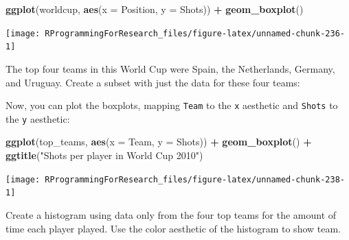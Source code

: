 \documentclass[]{book}
\makeatletter
\newenvironment{Shaded}{\begin{snugshade}}{\end{snugshade}}
\newcommand{\KeywordTok}[1]{\textcolor[rgb]{0.13,0.29,0.53}{\textbf{#1}}}
\newcommand{\DataTypeTok}[1]{\textcolor[rgb]{0.13,0.29,0.53}{#1}}
\newcommand{\StringTok}[1]{\textcolor[rgb]{0.31,0.60,0.02}{#1}}
\newcommand{\OperatorTok}[1]{\textcolor[rgb]{0.81,0.36,0.00}{\textbf{#1}}}
\newcommand{\NormalTok}[1]{#1}
\newenvironment{kframe}{%
\medskip{}
\setlength{\fboxsep}{.8em}
 \def\at@end@of@kframe{}%
 \ifinner\ifhmode%
  \def\at@end@of@kframe{\end{minipage}}%
  \begin{minipage}{\columnwidth}%
 \fi\fi%
 \def\FrameCommand##1{\hskip\@totalleftmargin \hskip-\fboxsep
 \colorbox{shadecolor}{##1}\hskip-\fboxsep
     \hskip-\linewidth \hskip-\@totalleftmargin \hskip\columnwidth}%
 \MakeFramed {\advance\hsize-\width
   \@totalleftmargin\z@ \linewidth\hsize
   \@setminipage}}%
 {\par\unskip\endMakeFramed%
 \at@end@of@kframe}
\renewenvironment{Shaded}{\begin{kframe}}{\end{kframe}}
\theoremstyle{definition}
\theoremstyle{definition}
\theoremstyle{definition}
\theoremstyle{remark}
\makeatother
\begin{document}
\begin{Shaded}
\begin{Highlighting}[]
\KeywordTok{ggplot}\NormalTok{(worldcup, }\KeywordTok{aes}\NormalTok{(}\DataTypeTok{x =}\NormalTok{ Position, }\DataTypeTok{y =}\NormalTok{ Shots)) }\OperatorTok{+}\StringTok{ }
\StringTok{  }\KeywordTok{geom_boxplot}\NormalTok{()}
\end{Highlighting}
\end{Shaded}

\begin{center}\texttt{[image: RProgrammingForResearch\_files/figure-latex/unnamed-chunk-236-1]} \end{center}

The top four teams in this World Cup were Spain, the Netherlands,
Germany, and Uruguay. Create a subset with just the data for these four
teams:

\begin{Shaded}
\end{Shaded}

Now, you can plot the boxplots, mapping \texttt{Team} to the \texttt{x}
aesthetic and \texttt{Shots} to the \texttt{y} aesthetic:

\begin{Shaded}
\begin{Highlighting}[]
\KeywordTok{ggplot}\NormalTok{(top_teams, }\KeywordTok{aes}\NormalTok{(}\DataTypeTok{x =}\NormalTok{ Team, }\DataTypeTok{y =}\NormalTok{ Shots)) }\OperatorTok{+}\StringTok{ }
\StringTok{  }\KeywordTok{geom_boxplot}\NormalTok{() }\OperatorTok{+}\StringTok{ }
\StringTok{  }\KeywordTok{ggtitle}\NormalTok{(}\StringTok{"Shots per player in World Cup 2010"}\NormalTok{)}
\end{Highlighting}
\end{Shaded}

\begin{center}\texttt{[image: RProgrammingForResearch\_files/figure-latex/unnamed-chunk-238-1]} \end{center}

Create a histogram using data only from the four top teams for the
amount of time each player played. Use the color aesthetic of the
histogram to show team.
\end{document}
